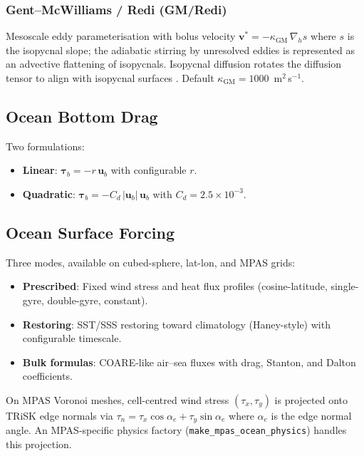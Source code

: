 \documentclass[11pt,a4paper]{article}
\begin{document}
\subsubsection{Gent--McWilliams / Redi (GM/Redi)}
Mesoscale eddy parameterisation \citep{GM1990} with bolus velocity $\bm v^*=-\kappa_{\mathrm{GM}}\,\nabla_h s$ where $s$ is the isopycnal slope; the adiabatic stirring by unresolved eddies is represented as an advective flattening of isopycnals.  Isopycnal diffusion rotates the diffusion tensor to align with isopycnal surfaces \citep{Redi1982}.  Default $\kappa_{\mathrm{GM}}=1000$~m$^2$\,s$^{-1}$.

\subsection{Ocean Bottom Drag}

Two formulations:
\begin{itemize}[nosep]
  \item \textbf{Linear}: $\bm\tau_b=-r\,\bm u_b$ with configurable $r$.
  \item \textbf{Quadratic}: $\bm\tau_b=-C_d\,|\bm u_b|\,\bm u_b$ with $C_d=2.5\times10^{-3}$.
\end{itemize}

\subsection{Ocean Surface Forcing}

Three modes, available on cubed-sphere, lat-lon, and MPAS grids:
\begin{itemize}[nosep]
  \item \textbf{Prescribed}: Fixed wind stress and heat flux profiles (cosine-latitude, single-gyre, double-gyre, constant).
  \item \textbf{Restoring}: SST/SSS restoring toward climatology (Haney-style) with configurable timescale.
  \item \textbf{Bulk formulas}: COARE-like air--sea fluxes with drag, Stanton, and Dalton coefficients.
\end{itemize}
On MPAS Voronoi meshes, cell-centred wind stress $(\tau_x,\tau_y)$ is projected onto TRiSK edge normals via $\tau_n = \tau_x\cos\alpha_e + \tau_y\sin\alpha_e$ where $\alpha_e$ is the edge normal angle.  An MPAS-specific physics factory (\texttt{make\_mpas\_ocean\_physics}) handles this projection.
\end{document}
